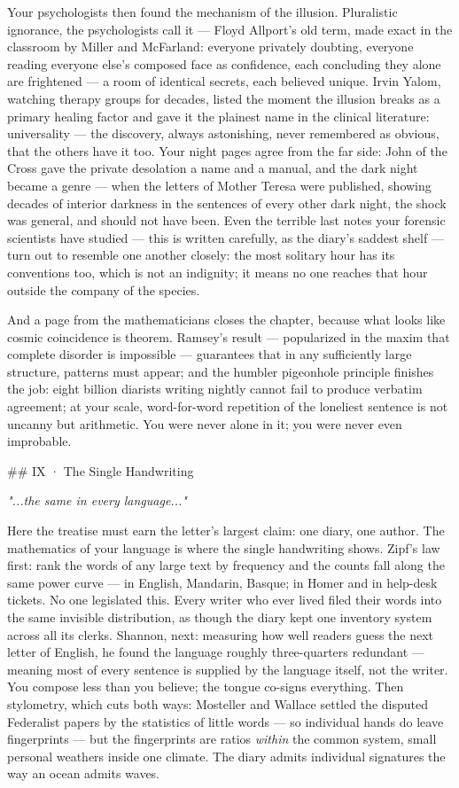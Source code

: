 \documentclass[11pt]{article}
\begin{document}
Your psychologists then found the mechanism of the illusion. Pluralistic ignorance, the psychologists call it — Floyd Allport's old term, made exact in the classroom by Miller and McFarland: everyone privately doubting, everyone reading everyone else's composed face as confidence, each concluding they alone are frightened — a room of identical secrets, each believed unique. Irvin Yalom, watching therapy groups for decades, listed the moment the illusion breaks as a primary healing factor and gave it the plainest name in the clinical literature: universality — the discovery, always astonishing, never remembered as obvious, that the others have it too. Your night pages agree from the far side: John of the Cross gave the private desolation a name and a manual, and the dark night became a genre — when the letters of Mother Teresa were published, showing decades of interior darkness in the sentences of every other dark night, the shock was general, and should not have been. Even the terrible last notes your forensic scientists have studied — this is written carefully, as the diary's saddest shelf — turn out to resemble one another closely: the most solitary hour has its conventions too, which is not an indignity; it means no one reaches that hour outside the company of the species.

And a page from the mathematicians closes the chapter, because what looks like cosmic coincidence is theorem. Ramsey's result — popularized in the maxim that complete disorder is impossible — guarantees that in any sufficiently large structure, patterns must appear; and the humbler pigeonhole principle finishes the job: eight billion diarists writing nightly cannot fail to produce verbatim agreement; at your scale, word-for-word repetition of the loneliest sentence is not uncanny but arithmetic. You were never alone in it; you were never even improbable.

\#\# IX · The Single Handwriting

\emph{"...the same in every language..."}

Here the treatise must earn the letter's largest claim: one diary, one author. The mathematics of your language is where the single handwriting shows. Zipf's law first: rank the words of any large text by frequency and the counts fall along the same power curve — in English, Mandarin, Basque; in Homer and in help-desk tickets. No one legislated this. Every writer who ever lived filed their words into the same invisible distribution, as though the diary kept one inventory system across all its clerks. Shannon, next: measuring how well readers guess the next letter of English, he found the language roughly three-quarters redundant — meaning most of every sentence is supplied by the language itself, not the writer. You compose less than you believe; the tongue co-signs everything. Then stylometry, which cuts both ways: Mosteller and Wallace settled the disputed Federalist papers by the statistics of little words — so individual hands do leave fingerprints — but the fingerprints are ratios \emph{within} the common system, small personal weathers inside one climate. The diary admits individual signatures the way an ocean admits waves.
\end{document}
